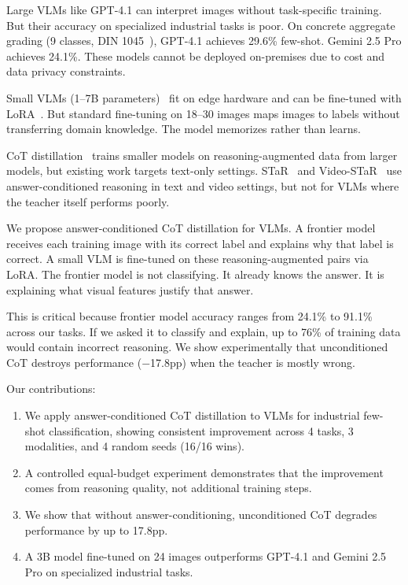 \documentclass[11pt]{article}
\begin{document}
Large VLMs like GPT-4.1 can interpret images without task-specific training. But their accuracy on specialized industrial tasks is poor. On concrete aggregate grading (9 classes, DIN 1045~\cite{din1045}), GPT-4.1 achieves 29.6\% few-shot. Gemini 2.5 Pro achieves 24.1\%. These models cannot be deployed on-premises due to cost and data privacy constraints.

Small VLMs (1--7B parameters)~\cite{wang2024qwen2vl} fit on edge hardware and can be fine-tuned with LoRA~\cite{hu2021lora}. But standard fine-tuning on 18--30 images maps images to labels without transferring domain knowledge. The model memorizes rather than learns.

CoT distillation~\cite{hsieh2023distilling} trains smaller models on reasoning-augmented data from larger models, but existing work targets text-only settings. STaR~\cite{zelikman2022star} and Video-STaR~\cite{zohar2025videostar} use answer-conditioned reasoning in text and video settings, but not for VLMs where the teacher itself performs poorly.

We propose answer-conditioned CoT distillation for VLMs. A frontier model receives each training image with its correct label and explains why that label is correct. A small VLM is fine-tuned on these reasoning-augmented pairs via LoRA. The frontier model is not classifying. It already knows the answer. It is explaining what visual features justify that answer.

This is critical because frontier model accuracy ranges from 24.1\% to 91.1\% across our tasks. If we asked it to classify and explain, up to 76\% of training data would contain incorrect reasoning. We show experimentally that unconditioned CoT destroys performance ($-$17.8pp) when the teacher is mostly wrong.

Our contributions:
\begin{enumerate}
\item We apply answer-conditioned CoT distillation to VLMs for industrial few-shot classification, showing consistent improvement across 4 tasks, 3 modalities, and 4 random seeds (16/16 wins).
\item A controlled equal-budget experiment demonstrates that the improvement comes from reasoning quality, not additional training steps.
\item We show that without answer-conditioning, unconditioned CoT degrades performance by up to 17.8pp.
\item A 3B model fine-tuned on 24 images outperforms GPT-4.1 and Gemini 2.5 Pro on specialized industrial tasks.
\end{enumerate}
\end{document}

